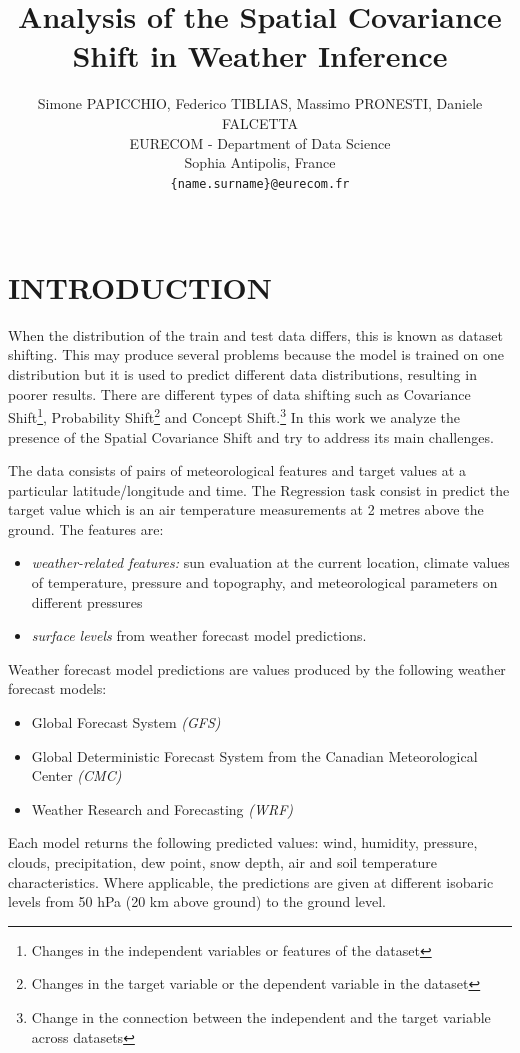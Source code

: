 \documentclass[letterpaper, 10 pt, conference]{ieeeconf}
\title{\LARGE \bf
Analysis of the Spatial Covariance Shift in Weather Inference
}
\author{Simone PAPICCHIO, Federico TIBLIAS, Massimo PRONESTI, Daniele FALCETTA%
\\EURECOM - Department of Data Science \\
Sophia Antipolis, France\\
{\tt\small\{name.surname\}@eurecom.fr} \\ \\
}
\begin{document}
    \maketitle
    \thispagestyle{plain}
    \pagestyle{plain}


\section{INTRODUCTION}
    When the distribution of the train and test data differs, this is known as dataset shifting. This may produce several problems because the model is trained on one distribution but it is used to predict different data distributions, resulting in poorer results. There are different types of data shifting such as 
    Covariance Shift\footnote{Changes in the independent variables or features of the dataset},
    Probability Shift\footnote{Changes in the target variable or the dependent variable in the dataset}
    and Concept Shift.\footnote{Change in the connection between the independent and the target variable across datasets}
    In this work we analyze the presence of the Spatial Covariance Shift and try to address its main challenges.

    The data consists of pairs of meteorological features and target values at a particular latitude/longitude and time.
    The Regression task consist in predict the target value which is an air temperature measurements at 2 metres above the ground.
    The features are:
    \begin{itemize}
        \item \textit{weather-related features:} sun evaluation at the current location, climate values of temperature, pressure and topography, and meteorological parameters on different pressures
        \item \textit{surface levels} from weather forecast model predictions.
    \end{itemize} 
    Weather forecast model predictions are values produced by the following weather forecast models: 

    \begin{itemize}
        \item Global Forecast System \textit{(GFS)}
        \item Global Deterministic Forecast System from the Canadian Meteorological Center \textit{(CMC)}
        \item Weather Research and Forecasting \textit{(WRF) }
    \end{itemize}
    Each model returns the following predicted values: wind, humidity, pressure, clouds, precipitation, dew point, snow depth, air and soil temperature characteristics. Where applicable, the predictions are given at different isobaric levels from 50 hPa (20 km above ground) to the ground level.
\end{document}
